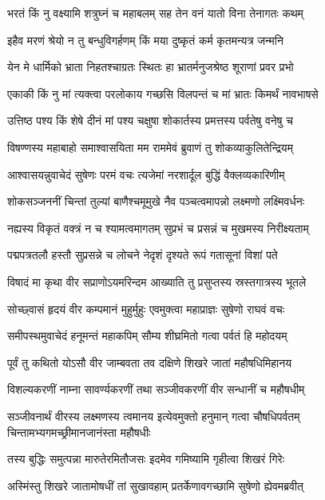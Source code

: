 \twolineshloka
{भरतं किं नु वक्ष्यामि शत्रुघ्नं च महाबलम्}
{सह तेन वनं यातो विना तेनागतः कथम्} %

\twolineshloka
{इहैव मरणं श्रेयो न तु बन्धुविगर्हणम्}
{किं मया दुष्कृतं कर्म कृतमन्यत्र जन्मनि} %

\twolineshloka
{येन मे धार्मिको भ्राता निहतश्चाग्रतः स्थितः}
{हा भ्रातर्मनुजश्रेष्ठ शूराणां प्रवर प्रभो} %

\twolineshloka
{एकाकी किं नु मां त्यक्त्वा परलोकाय गच्छसि}
{विलपन्तं च मां भ्रातः किमर्थं नावभाषसे} %

\twolineshloka
{उत्तिष्ठ पश्य किं शेषे दीनं मां पश्य चक्षुषा}
{शोकार्तस्य प्रमत्तस्य पर्वतेषु वनेषु च} %

\twolineshloka
{विषण्णस्य महाबाहो समाश्वासयिता मम}
{राममेवं ब्रुवाणं तु शोकव्याकुलितेन्द्रियम्} %

\twolineshloka
{आश्वासयन्नुवाचेदं सुषेणः परमं वचः}
{त्यजेमां नरशार्दूल बुद्धिं वैक्लव्यकारिणीम्} %

\twolineshloka
{शोकसञ्जननीं चिन्तां तुल्यां बाणैश्चमूमुखे}
{नैव पञ्चत्वमापन्नो लक्ष्मणो लक्ष्मिवर्धनः} %

\twolineshloka
{नह्यस्य विकृतं वक्त्रं न च श्यामत्वमागतम्}
{सुप्रभं च प्रसन्नं च मुखमस्य निरीक्ष्यताम्} %

\twolineshloka
{पद्मपत्रतलौ हस्तौ सुप्रसन्ने च लोचने}
{नेदृशं दृश्यते रूपं गतासूनां विशां पते} %

\twolineshloka
{विषादं मा कृथा वीर सप्राणोऽयमरिन्दम}
{आख्याति तु प्रसुप्तस्य स्रस्तगात्रस्य भूतले} %

\twolineshloka
{सोच्छ्वासं हृदयं वीर कम्पमानं मुहुर्मुहुः}
{एवमुक्त्वा महाप्राज्ञः सुषेणो राघवं वचः} %

\twolineshloka
{समीपस्थमुवाचेदं हनूमन्तं महाकपिम्}
{सौम्य शीघ्रमितो गत्वा पर्वतं हि महोदयम्} %

\twolineshloka
{पूर्वं तु कथितो योऽसौ वीर जाम्बवता तव}
{दक्षिणे शिखरे जातां महौषधिमिहानय} %

\twolineshloka
{विशल्यकरणीं नाम्ना सावर्ण्यकरणीं तथा}
{सञ्जीवकरणीं वीर सन्धानीं च महौषधीम्} %

\threelineshloka
{सञ्जीवनार्थं वीरस्य लक्ष्मणस्य त्वमानय}
{इत्येवमुक्तो हनुमान् गत्वा चौषधिपर्वतम्}
{चिन्तामभ्यगमच्छ्रीमानजानंस्ता महौषधीः} %

\twolineshloka
{तस्य बुद्धिः समुत्पन्ना मारुतेरमितौजसः}
{इदमेव गमिष्यामि गृहीत्वा शिखरं गिरेः} %

\twolineshloka
{अस्मिंस्तु शिखरे जातामोषधीं तां सुखावहाम्}
{प्रतर्केणावगच्छामि सुषेणो ह्येवमब्रवीत्} %

